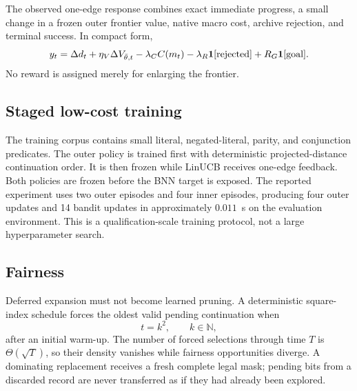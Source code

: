The observed one-edge response combines exact immediate progress, a small change in a frozen outer frontier value, native macro cost, archive rejection, and terminal success.  In compact form,
\begin{equation}
y_t=\Delta d_t
+\eta_V\Delta V_{\bar\theta,t}
-\lambda_C C(m_t)
-\lambda_R\mathbf{1}[\text{rejected}]
+R_G\mathbf{1}[\text{goal}].
\label{eq:bandit-response}
\end{equation}
No reward is assigned merely for enlarging the frontier.

\subsection{Staged low-cost training}

The training corpus contains small literal, negated-literal, parity, and conjunction predicates.  The outer policy is trained first with deterministic projected-distance continuation order.  It is then frozen while LinUCB receives one-edge feedback.  Both policies are frozen before the BNN target is exposed.  The reported experiment uses two outer episodes and four inner episodes, producing four outer updates and 14 bandit updates in approximately $0.011$~s on the evaluation environment.  This is a qualification-scale training protocol, not a large hyperparameter search.

\subsection{Fairness}

Deferred expansion must not become learned pruning.  A deterministic square-index schedule forces the oldest valid pending continuation when
\begin{equation}
t=k^2,
\qquad k\in\mathbb N,
\label{eq:square-fairness}
\end{equation}
after an initial warm-up.  The number of forced selections through time $T$ is $\Theta(\sqrt T)$, so their density vanishes while fairness opportunities diverge.  A dominating replacement receives a fresh complete legal mask; pending bits from a discarded record are never transferred as if they had already been explored.

